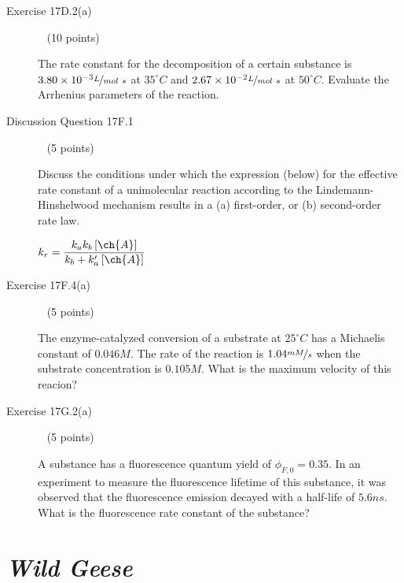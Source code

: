 \documentclass[12pt, openany, letterpaper]{memoir}
\begin{document}
\begin{description}
	\vspace{10em}
	\item [Exercise 17D.2(a)] ~ (10 points)
	
	The rate constant for the decomposition of a certain substance is $3.80\times10^{-3}\nicefrac{L}{mol~s}$ at $35^\circ C$ and $2.67\times10^{-2}\nicefrac{L}{mol~s}$ at $50^\circ C$. Evaluate the Arrhenius parameters of the reaction.
	
	\newpage
	\item [Discussion Question 17F.1] ~ (5 points)
	
	Discuss the conditions under which the expression (below)   for the effective rate constant of a unimolecular reaction according to the Lindemann-Hinshelwood mechanism results in a (a) first-order, or (b) second-order rate law.
	
	$k_r=\dfrac{k_ak_b\left[\ch{A}\right]}{k_b + k^\prime_a\left[\ch{A}\right]}$

	\vspace{8em}
	\item [Exercise 17F.4(a)] ~ (5 points)
	
	The enzyme-catalyzed conversion of a substrate at $25^\circ C$ has a Michaelis constant of $0.046M$. The rate of the reaction is $1.04\nicefrac{mM}{s}$ when the substrate concentration is $0.105 M$. What is the maximum velocity of this reacion?
	
	\vspace{15em}
	\item [Exercise 17G.2(a)] ~ (5 points)
	
	A substance has a fluorescence quantum yield of $\phi_{F,0}=0.35$. In an experiment to measure the fluorescence lifetime of this substance, it was observed that the fluorescence emission decayed with a half-life of $5.6ns$. What is the fluorescence rate constant of the substance?
\end{description}
\newpage
\pagestyle{empty}
\addtocounter{page}{-1}
\section*{\emph{Wild Geese}}
\end{document}

